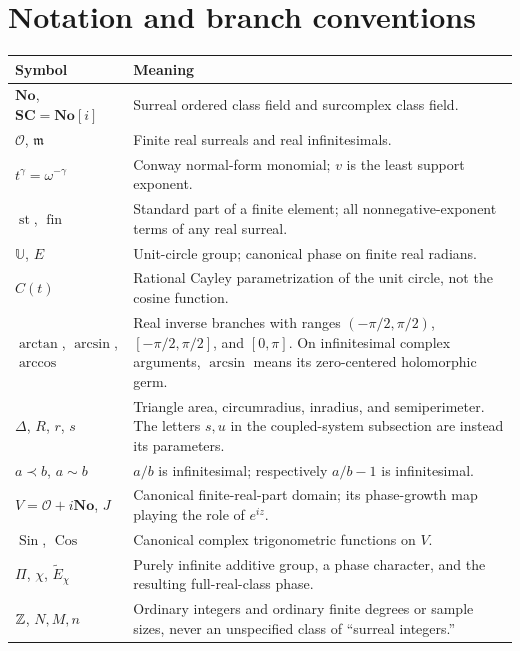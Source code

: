 \documentclass[11pt,letterpaper]{article}
\theoremstyle{definition}
\theoremstyle{remark}
\newcommand{\No}{\mathbf{No}}
\newcommand{\SC}{\mathbf{SC}}
\newcommand{\OO}{\mathcal O}\newcommand{\mm}{\mathfrak m}
\newcommand{\U}{\mathbb U}\newcommand{\PP}{\mathbb P}
\newcommand{\st}{\operatorname{st}}
\newcommand{\fin}{\operatorname{fin}}
\newcommand{\arcs}{\operatorname{arcsin}}
\newcommand{\arcc}{\operatorname{arccos}}
\newcommand{\arct}{\operatorname{arctan}}
\newcommand{\Sin}{\operatorname{Sin}}\newcommand{\Cos}{\operatorname{Cos}}
\numberwithin{equation}{section}
\begin{document}
\section{Notation and branch conventions}
\begin{center}\small
\begin{longtable}{@{}L{0.28\textwidth}L{0.59\textwidth}@{}}
\toprule
Symbol & Meaning\\
\midrule\endhead
$\No$, $\SC=\No[i]$ & Surreal ordered class field and surcomplex class field.\\[0.25em]
$\OO$, $\mm$ & Finite real surreals and real infinitesimals.\\[0.25em]
$t^\gamma=\omega^{-\gamma}$ & Conway normal-form monomial; $v$ is the least support exponent.\\[0.25em]
$\st$, $\fin$ & Standard part of a finite element; all nonnegative-exponent terms of any real surreal.\\[0.25em]
$\U$, $E$ & Unit-circle group; canonical phase on finite real radians.\\[0.25em]
$C(t)$ & Rational Cayley parametrization of the unit circle, not the cosine function.\\[0.25em]
$\arct$, $\arcs$, $\arcc$ & Real inverse branches with ranges $(-\pi/2,\pi/2)$, $[-\pi/2,\pi/2]$, and $[0,\pi]$. On infinitesimal complex arguments, $\arcs$ means its zero-centered holomorphic germ.\\[0.25em]
$\Delta$, $R$, $r$, $s$ & Triangle area, circumradius, inradius, and semiperimeter. The letters $s,u$ in the coupled-system subsection are instead its parameters.\\[0.25em]
$a\prec b$, $a\sim b$ & $a/b$ is infinitesimal; respectively $a/b-1$ is infinitesimal.\\[0.25em]
$V=\OO+i\No$, $J$ & Canonical finite-real-part domain; its phase-growth map playing the role of $e^{iz}$.\\[0.25em]
$\Sin$, $\Cos$ & Canonical complex trigonometric functions on $V$.\\[0.25em]
$\Pi$, $\chi$, $\widetilde E_\chi$ & Purely infinite additive group, a phase character, and the resulting full-real-class phase.\\[0.25em]
$\mathbb Z$, $N,M,n$ & Ordinary integers and ordinary finite degrees or sample sizes, never an unspecified class of ``surreal integers.''\\
\bottomrule
\end{longtable}
\end{center}
\end{document}
